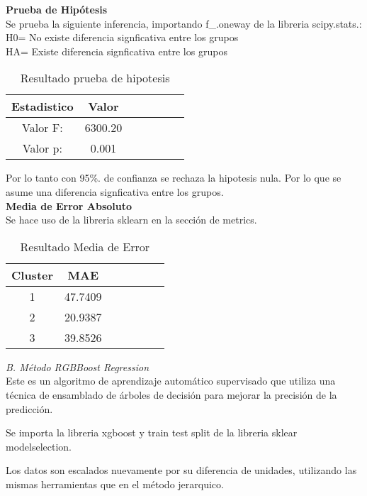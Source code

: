 \documentclass[5p,times,authoryear]{sciarticle}
\begin{document}
\begin{multicols}{2}
{\begin{itemize}
\textbf{Prueba de Hipótesis} \\
Se prueba la siguiente inferencia, importando f\_.oneway de la libreria scipy.stats.:\\
H0= No existe diferencia signficativa entre los grupos\\
HA= Existe diferencia signficativa entre los grupos\\

\begin{table}[H]
\centering
         \caption{Resultado prueba de hipotesis}
        \label{tab:correlacion}
    \begin{tabular}{c|cccccc}
 Estadistico & Valor \\
\hline
Valor F: & 6300.20  \\
Valor p: & 0.001  \\
\hline
    \end{tabular}
\end{table}

Por lo tanto con 95\%. de confianza se rechaza la hipotesis nula. Por lo que se asume una diferencia signficativa entre los grupos.\\

\textbf{Media de Error Absoluto} \\
Se hace uso de la libreria sklearn en la sección de metrics.


\begin{table}[H]
\centering
         \caption{Resultado Media de Error}
        \label{tab:correlacion}
    \begin{tabular}{c|cccccc}
Cluster &  MAE \\
\hline
1 & 47.7409  \\
2 & 20.9387  \\
3 & 39.8526  \\
\hline
    \end{tabular}
\end{table}
\end{itemize}

\emph {B. Método RGBBoost Regression} \\
Este es un algoritmo de aprendizaje automático supervisado que utiliza una técnica de ensamblado de árboles de decisión para mejorar la precisión de la predicción. 

Se importa la libreria xgboost y train test split de la libreria sklear modelselection.

Los datos son escalados nuevamente por su diferencia de unidades, utilizando las mismas herramientas que en el método jerarquico.

}
\end{multicols}
\end{document}

